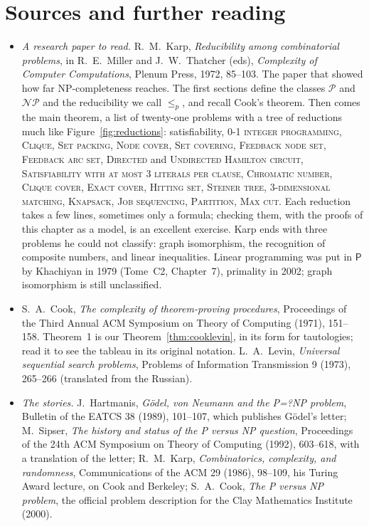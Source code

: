 \section*{Sources and further reading}

\begin{itemize}
\item \emph{A research paper to read.} R.~M.~Karp, \emph{Reducibility among combinatorial problems}, in R.~E.~Miller and J.~W.~Thatcher (eds), \emph{Complexity of Computer Computations}, Plenum Press, 1972, 85--103. The paper that showed how far NP-completeness reaches. The first sections define the classes $\mathcal P$ and $\mathcal{NP}$ and the reducibility we call $\le_p$, and recall Cook's theorem. Then comes the main theorem, a list of twenty-one problems with a tree of reductions much like Figure~\ref{fig:reductions}: satisfiability, \textup{\textsc{0-1 integer programming}}, \textup{\textsc{Clique}}, \textup{\textsc{Set packing}}, \textup{\textsc{Node cover}}, \textup{\textsc{Set covering}}, \textup{\textsc{Feedback node set}}, \textup{\textsc{Feedback arc set}}, \textup{\textsc{Directed}} and \textup{\textsc{Undirected Hamilton circuit}}, \textup{\textsc{Satisfiability with at most 3 literals per clause}}, \textup{\textsc{Chromatic number}}, \textup{\textsc{Clique cover}}, \textup{\textsc{Exact cover}}, \textup{\textsc{Hitting set}}, \textup{\textsc{Steiner tree}}, \textup{\textsc{3-dimensional matching}}, \textup{\textsc{Knapsack}}, \textup{\textsc{Job sequencing}}, \textup{\textsc{Partition}}, \textup{\textsc{Max cut}}. Each reduction takes a few lines, sometimes only a formula; checking them, with the proofs of this chapter as a model, is an excellent exercise. Karp ends with three problems he could not classify: graph isomorphism, the recognition of composite numbers, and linear inequalities. Linear programming was put in $\mathsf P$ by Khachiyan in 1979 (Tome~C2, Chapter~7), primality in 2002; graph isomorphism is still unclassified.
\item S.~A.~Cook, \emph{The complexity of theorem-proving procedures}, Proceedings of the Third Annual ACM Symposium on Theory of Computing (1971), 151--158. Theorem~1 is our Theorem~\ref{thm:cooklevin}, in its form for tautologies; read it to see the tableau in its original notation. L.~A.~Levin, \emph{Universal sequential search problems}, Problems of Information Transmission 9 (1973), 265--266 (translated from the Russian).
\item \emph{The stories.} J.~Hartmanis, \emph{Gödel, von Neumann and the P=?NP problem}, Bulletin of the EATCS 38 (1989), 101--107, which publishes Gödel's letter; M.~Sipser, \emph{The history and status of the P versus NP question}, Proceedings of the 24th ACM Symposium on Theory of Computing (1992), 603--618, with a translation of the letter; R.~M.~Karp, \emph{Combinatorics, complexity, and randomness}, Communications of the ACM 29 (1986), 98--109, his Turing Award lecture, on Cook and Berkeley; S.~A.~Cook, \emph{The P versus NP problem}, the official problem description for the Clay Mathematics Institute (2000).

\end{itemize}
